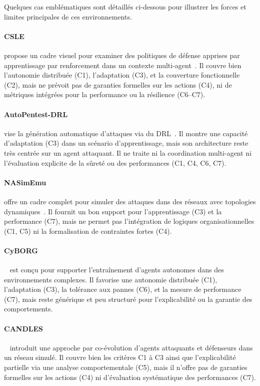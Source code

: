 \medskip

Quelques cas emblématiques sont détaillés ci-dessous pour illustrer les forces et limites principales de ces environnements.

\paragraph{CSLE} propose un cadre visuel pour examiner des politiques de défense apprises par apprentissage par renforcement dans un contexte multi-agent~\cite{hammar_stadler_noms_22}. Il couvre bien l’autonomie distribuée (C1), l’adaptation (C3), et la couverture fonctionnelle (C2), mais ne prévoit pas de garanties formelles sur les actions (C4), ni de métriques intégrées pour la performance ou la résilience (C6–C7).

\paragraph{AutoPentest-DRL} vise la génération automatique d’attaques via du DRL~\cite{CROND}. Il montre une capacité d’adaptation (C3) dans un scénario d’apprentissage, mais son architecture reste très centrée sur un agent attaquant. Il ne traite ni la coordination multi-agent ni l’évaluation explicite de la sûreté ou des performances (C1, C4, C6, C7).

\paragraph{NASimEmu} offre un cadre complet pour simuler des attaques dans des réseaux avec topologies dynamiques~\cite{janisch2023nasimemu}. Il fournit un bon support pour l’apprentissage (C3) et la performance (C7), mais ne permet pas l’intégration de logiques organisationnelles (C1, C5) ni la formalisation de contraintes fortes (C4).

\paragraph{CyBORG}~\cite{standen2021cyborg} est conçu pour supporter l'entraînement d'agents autonomes dans des environnements complexes. Il favorise une autonomie distribuée (C1), l’adaptation (C3), la tolérance aux pannes (C6), et la mesure de performance (C7), mais reste générique et peu structuré pour l'explicabilité ou la garantie des comportements.

\paragraph{CANDLES}~\cite{10.1145/2739482.2768429} introduit une approche par co-évolution d’agents attaquants et défenseurs dans un réseau simulé. Il couvre bien les critères C1 à C3 ainsi que l’explicabilité partielle via une analyse comportementale (C5), mais il n’offre pas de garanties formelles sur les actions (C4) ni d’évaluation systématique des performances (C7).

